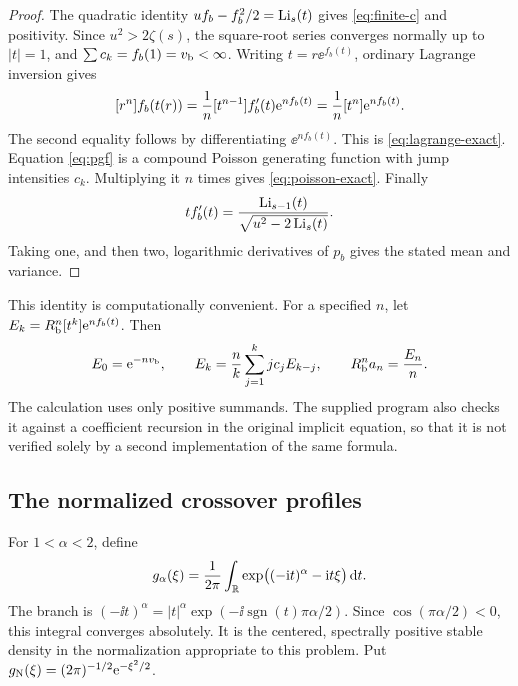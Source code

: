 \begin{proof}
The quadratic identity $u f_b-f_b^2/2=\operatorname{Li}_s(t)$ gives
\eqref{eq:finite-c} and positivity.  Since $u^2>2\zeta(s)$, the
square-root series converges normally up to $|t|=1$, and
$\sum c_k=f_b(1)=v_{\mathrm b}<\infty$.
Writing $t=r\ee^{f_b(t)}$, ordinary Lagrange inversion gives
\[
 [r^{n}] f_b(t(r))
 =\frac1n[t^{n-1}] f_b'(t)\mathrm e^{nf_b(t)}
 =\frac1n[t^{n}]\mathrm e^{nf_b(t)}.
\]
The second equality follows by differentiating $\ee^{nf_b(t)}$.
This is \eqref{eq:lagrange-exact}.  Equation \eqref{eq:pgf} is a
compound Poisson generating function with jump intensities $c_k$.
Multiplying it $n$ times gives \eqref{eq:poisson-exact}.
Finally
\[
 t f_b'(t)=\frac{\operatorname{Li}_{s-1}(t)}{\sqrt{u^2-2\operatorname{Li}_s(t)}}.
\]
Taking one, and then two, logarithmic derivatives of $p_b$ gives
the stated mean and variance.
\end{proof}

This identity is computationally convenient.  For a specified $n$,
let $E_k=R_{\mathrm b}^n[t^{k}]\mathrm e^{nf_b(t)}$.  Then
\begin{equation}\label{eq:finite-E}
 E_0=\mathrm e^{-nv_{\mathrm b}},\qquad
 E_k=\frac n k\sum_{j=1}^k j c_jE_{k-j},\qquad
 R_{\mathrm b}^n a_n=\frac{E_n}{n}.
\end{equation}
The calculation uses only positive summands.  The supplied program
also checks it against a coefficient recursion in the original
implicit equation, so that it is not verified solely by a second
implementation of the same formula.

\subsection{The normalized crossover profiles}

For $1<\alpha<2$, define
\begin{equation}\label{eq:stable-density}
 g_\alpha(\xi)=\frac1{2\pi}\int_{\mathbb R}
       \exp\bigl((-\mathrm i t)^\alpha-\mathrm i t\xi\bigr)\,\mathrm d t.
\end{equation}
The branch is $(-\ii t)^\alpha=|t|^\alpha
\exp(-\ii\operatorname{sgn}(t)\pi\alpha/2)$.
Since $\cos(\pi\alpha/2)<0$, this integral converges absolutely.
It is the centered, spectrally positive stable density in the
normalization appropriate to this problem.  Put
$g_{\rm N}(\xi)=(2\pi)^{-1/2}\mathrm e^{-\xi^2/2}$.

